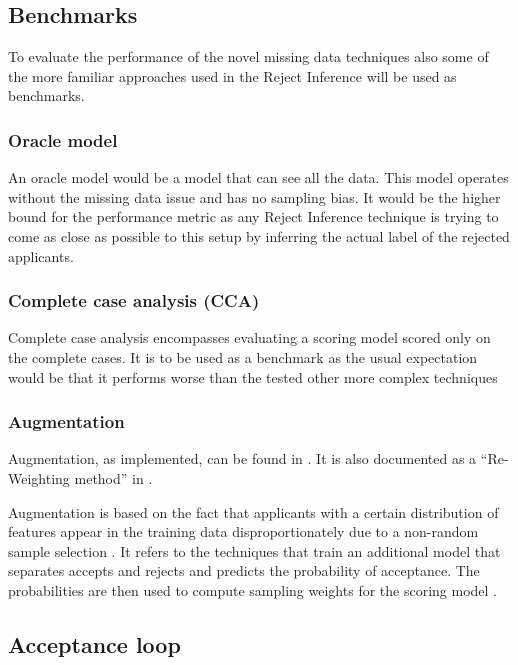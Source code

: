\documentclass[11pt,a4paper]{article}
\begin{document}
\subsection{Benchmarks}

To evaluate the performance of the novel missing data techniques also some of the more familiar approaches used in the Reject Inference will be used as benchmarks.


\subsubsection{Oracle model}

An oracle model would be a model that can see all the data. This model operates without the missing data issue and has no sampling bias. It would be the higher bound for the performance metric as any Reject Inference technique is trying to come as close as possible to this setup by inferring the actual label of the rejected applicants. 

\subsubsection{Complete case analysis (CCA)}

Complete case analysis encompasses evaluating a scoring model scored only on the complete cases. It is to be used as a benchmark as the usual expectation would be that it performs worse than the tested other more complex techniques

\subsubsection{Augmentation} \label{augmentation}


Augmentation, as implemented, can be found in \cite{ehrhardt_reject_2021}. It is also documented as a ``Re-Weighting method'' in \cite{Banasik_Crook_2010}.

Augmentation is based on the fact that applicants with a certain distribution of features appear in the training data disproportionately due to a non-random sample selection \cite{Banasik_Crook_2010}. It refers to the techniques that train an additional model that separates accepts and rejects and predicts the probability of acceptance. The probabilities are then used to compute sampling weights for the scoring model \cite{kozodoi2020shallow}.



\subsection{Acceptance loop} \label{aloop}
\end{document}
